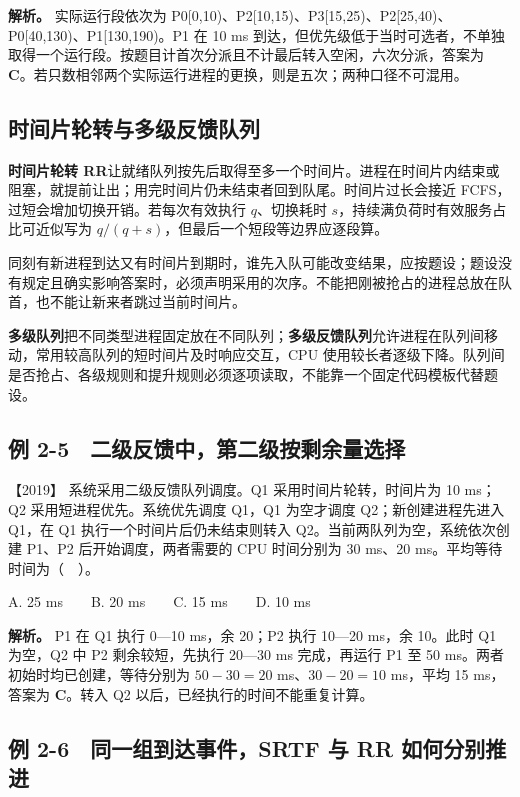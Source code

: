 \textbf{解析。} 实际运行段依次为 P0{[}0,10)、P2{[}10,15)、P3{[}15,25)、P2{[}25,40)、P0{[}40,130)、P1{[}130,190)。P1 在 10 ms 到达，但优先级低于当时可选者，不单独取得一个运行段。按题目计首次分派且不计最后转入空闲，六次分派，答案为 \textbf{C}。若只数相邻两个实际运行进程的更换，则是五次；两种口径不可混用。

\subsection{时间片轮转与多级反馈队列}\label{os-c02-h184}

\textbf{时间片轮转 RR}让就绪队列按先后取得至多一个时间片。进程在时间片内结束或阻塞，就提前让出；用完时间片仍未结束者回到队尾。时间片过长会接近 FCFS，过短会增加切换开销。若每次有效执行 \(q\)、切换耗时 \(s\)，持续满负荷时有效服务占比可近似写为 \(q/(q+s)\)，但最后一个短段等边界应逐段算。

同刻有新进程到达又有时间片到期时，谁先入队可能改变结果，应按题设；题设没有规定且确实影响答案时，必须声明采用的次序。不能把刚被抢占的进程总放在队首，也不能让新来者跳过当前时间片。

\textbf{多级队列}把不同类型进程固定放在不同队列；\textbf{多级反馈队列}允许进程在队列间移动，常用较高队列的短时间片及时响应交互，CPU 使用较长者逐级下降。队列间是否抢占、各级规则和提升规则必须逐项读取，不能靠一个固定代码模板代替题设。

\subsection{例 2-5　二级反馈中，第二级按剩余量选择}\label{os-ex2-5}

\noindent{}【2019】 系统采用二级反馈队列调度。Q1 采用时间片轮转，时间片为 10 ms；Q2 采用短进程优先。系统优先调度 Q1，Q1 为空才调度 Q2；新创建进程先进入 Q1，在 Q1 执行一个时间片后仍未结束则转入 Q2。当前两队列为空，系统依次创建 P1、P2 后开始调度，两者需要的 CPU 时间分别为 30 ms、20 ms。平均等待时间为（　）。

A. 25 ms　　B. 20 ms　　C. 15 ms　　D. 10 ms


\textbf{解析。} P1 在 Q1 执行 0---10 ms，余 20；P2 执行 10---20 ms，余 10。此时 Q1 为空，Q2 中 P2 剩余较短，先执行 20---30 ms 完成，再运行 P1 至 50 ms。两者初始时均已创建，等待分别为 \(50-30=20\) ms、\(30-20=10\) ms，平均 15 ms，答案为 \textbf{C}。转入 Q2 以后，已经执行的时间不能重复计算。

\subsection{例 2-6　同一组到达事件，SRTF 与 RR 如何分别推进}\label{os-ex2-6}

